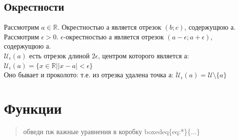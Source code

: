 \documentclass[oneside]{book}
\begin{document}
\begin{enumerate}
\section{Окрестности}

Рассмотрим $a \in \mathbb{R}$. Окрестностью а является отрезок $(b; c)$, содержущюю а.
Рассмотрим $\epsilon > 0$. $\epsilon$-окрестностью а является отрезок $(a-\epsilon; a+\epsilon)$, содержущюю а.\\
$\mathcal{U}_\epsilon(a)$ есть отрезок длиной  $2\epsilon$, центром которого является а: \\
$\mathcal{U}_\epsilon(a) = \{x \in \mathbb{R} | |x-a|< \epsilon\}$\\
Оно бывает и проколото: т.е. из отрезка удалена точка а: $\dot{\mathcal{U}}_\epsilon(a) = \mathcal{U} \setminus \{a\}$

\setcounter{chapter}{1}
\chapter{Функции}
\begin{quote}
    обведи пж важные уравнения в коробку boxedeq\{eq:*\}\{...\}
\end{quote}


\end{enumerate}
\end{document}
